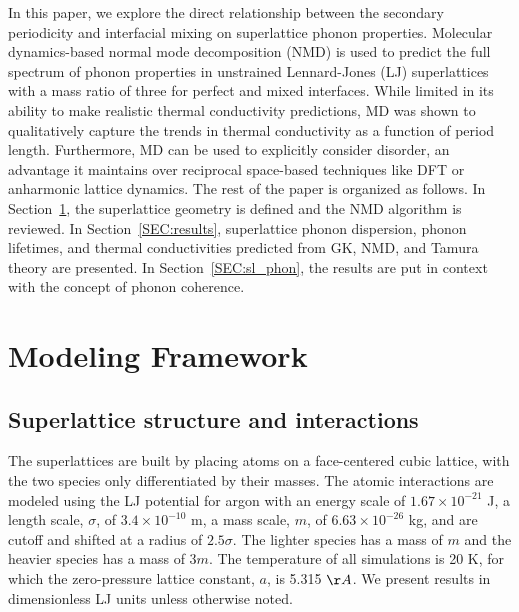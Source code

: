 \documentclass[aps,prb,preprint,preprintnumbers,amsmath,amssymb,floatfix,superscriptaddress]{revtex4}
\begin{document}

In this paper, we explore the direct relationship between the secondary periodicity and interfacial mixing on superlattice phonon properties. Molecular dynamics-based normal mode decomposition (NMD) is used to predict the full spectrum of phonon properties in unstrained Lennard-Jones (LJ) superlattices with a mass ratio of three for perfect and mixed interfaces. While limited in its ability to make realistic thermal conductivity predictions, MD was shown to qualitatively capture the trends in thermal conductivity as a function of period length.\cite{PhysRevB.79.075316,PhysRevB.72.174302} Furthermore, MD can be used to explicitly consider disorder, an advantage it maintains over reciprocal space-based techniques like DFT or anharmonic lattice dynamics. The rest of the paper is organized as follows. In Section~\ref{SEC:modeling}, the superlattice geometry is defined and the NMD algorithm is reviewed. In Section~\ref{SEC:results}, superlattice phonon dispersion, phonon lifetimes, and thermal conductivities predicted from GK, NMD, and Tamura theory are presented. In Section~\ref{SEC:sl_phon}, the results are put in context with the concept of phonon coherence.


\section{Modeling Framework}\label{SEC:modeling}
\subsection{Superlattice structure and interactions}\label{SEC:sl_struc}
The superlattices are built by placing atoms on a face-centered cubic lattice, with the two species only differentiated by their masses. The atomic interactions are modeled using the LJ potential for argon with an energy scale of $1.67\times10^{-21}$ J, a length scale, $\sigma$, of $3.4\times10^{-10}$ m, a mass scale, $m$, of $6.63\times10^{-26}$ kg, and are cutoff and shifted at a radius of $2.5\sigma$. The lighter species has a mass of $m$ and the heavier species has a mass of $3m$. The temperature of all simulations is 20 K, for which the zero-pressure lattice constant, $a$, is 5.315 $\AA$.\cite{mcgaugheythesis} We present results in  dimensionless LJ units unless otherwise noted. 
\end{document}
